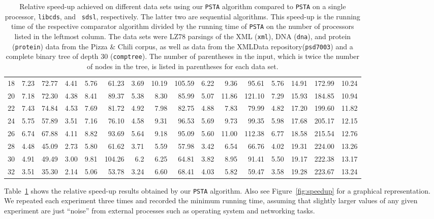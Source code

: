 \begin{table}[ht]
\begin{tabular}{crrrrrrrrrrrrrrr}
\hline\hline
 18  &  7.23 &  72.77 & 4.41 &  5.76 & 61.23  & 3.69 &  10.19 & 105.59 & 6.22 &  9.36  &  95.61  &  5.76  & 14.91 & 172.99 & 10.24\\
 20  &  7.18 &  72.30 & 4.38 &  8.41 & 89.37  & 5.38 &  8.30  & 85.99  & 5.07 &  11.86 &  121.10 &  7.29  & 15.93 & 184.85 & 10.94\\
 22  &  7.43 &  74.84 & 4.53 &  7.69 & 81.72  & 4.92 &  7.98  & 82.75  & 4.88 &  7.83  &  79.99  &  4.82  & 17.20 & 199.60 & 11.82\\
 24  &  5.75 &  57.89 & 3.51 &  7.16 & 76.10  & 4.58 &  9.31  & 96.53  & 5.69 &  9.73  &  99.35  &  5.98  & 17.68 & 205.17 & 12.15\\
 26  &  6.74 &  67.88 & 4.11 &  8.82 & 93.69  & 5.64 &  9.18  & 95.09  & 5.60 &  11.00 &  112.38 &  6.77  & 18.58 & 215.54 & 12.76\\
 28  &  4.48 &  45.09 & 2.73 &  5.80 & 61.62  & 3.71 &  5.59  & 57.98  & 3.42 &  6.54  &  66.76  &  4.02  & 19.31 & 224.00 & 13.26\\
 30  &  4.91 &  49.49 & 3.00 &  9.81 & 104.26 & 6.2  &  6.25  & 64.81  & 3.82 &  8.95  &  91.41  &  5.50  & 19.17 & 222.38 & 13.17\\
 32  &  3.51 &  35.30 & 2.14 &  5.06 & 53.78  & 3.24 &  6.60  & 68.41  & 4.03 &  5.82  &  59.47  &  3.58  & 19.28 & 223.67 & 13.24\\
 \hline
\end{tabular}
\caption[]{Relative speed-up achieved on different data sets using our {\tt PSTA}
  algorithm compared to {\tt PSTA} on a single processor, {\tt libcds}, and {\tt
    sdsl}, respectively.
  The latter two are sequential algorithms.
  This speed-up is the running time of the respective comparator algorithm
  divided by the running time of {\tt PSTA} on the number of processors listed
  in the leftmost column.
  The data sets were LZ78 parsings of the XML ({\tt xml}), DNA ({\tt dna}), and
  protein ({\tt protein}) data from the Pizza \& Chili
  corpus\footnotemark[\value{pizzachili}], as well as data from the XMLData
  repository\footnotemark[\value{xmldata}] ({\tt psd7003}) and a complete binary tree of
  depth 30 ({\tt comptree}).
  The number of parentheses in the input, which is twice the number of nodes in
  the tree, is listed in parentheses for each data set.}
\label{tbl:speedup}
\end{table}

Table~\ref{tbl:speedup} shows the relative speed-up results obtained by our
{\tt PSTA} algorithm.
Also see Figure~\ref{fig:speedup} for a graphical representation.
We repeated each experiment three times and recorded the minimum running time,
assuming that slightly larger values of any given experiment are just ``noise''
from external processes such as operating system and networking
tasks.

